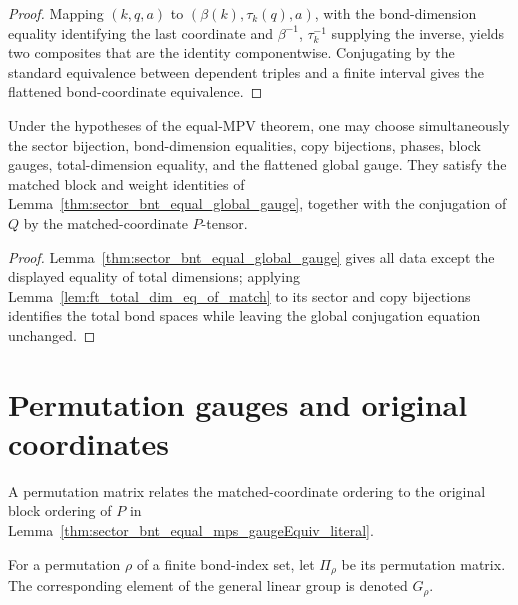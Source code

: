 \begin{proof}\leanok
    Mapping $(k,q,a)$ to $(\beta(k),\tau_k(q),a)$, with the bond-dimension
    equality identifying the last coordinate and $\beta^{-1}$, $\tau_k^{-1}$
    supplying the inverse, yields two composites that are the identity
    componentwise. Conjugating by the standard equivalence between dependent
    triples and a finite interval gives the flattened bond-coordinate
    equivalence.
\end{proof}

\begin{lemma}
    \label{thm:sector_bnt_equal_mps_gaugeEquiv_witnesses}
    \leanok
    Under the hypotheses of the equal-MPV theorem, one may choose
    simultaneously the sector bijection, bond-dimension equalities, copy
    bijections, phases, block gauges, total-dimension equality, and the
    flattened global gauge. They satisfy the matched block and weight
    identities of Lemma~\ref{thm:sector_bnt_equal_global_gauge}, together
    with the conjugation of $Q$ by the matched-coordinate $P$-tensor.
\end{lemma}

\begin{proof}\leanok
    Lemma~\ref{thm:sector_bnt_equal_global_gauge} gives all data except the
    displayed equality of total dimensions; applying
    Lemma~\ref{lem:ft_total_dim_eq_of_match} to its sector and copy bijections
    identifies the total bond spaces while leaving the global conjugation
    equation unchanged.
\end{proof}

\section{Permutation gauges and original coordinates}
\label{sec:app_ft_permutation_gauges}

A permutation matrix relates the matched-coordinate ordering to the original
block ordering of $P$ in Lemma~\ref{thm:sector_bnt_equal_mps_gaugeEquiv_literal}.

\begin{definition}
    \label{def:ft_perm_gl}
    \leanok
    For a permutation $\rho$ of a finite bond-index set, let $\Pi_\rho$ be its
    permutation matrix. The corresponding element of the general linear group
    is denoted $G_\rho$.
\end{definition}

